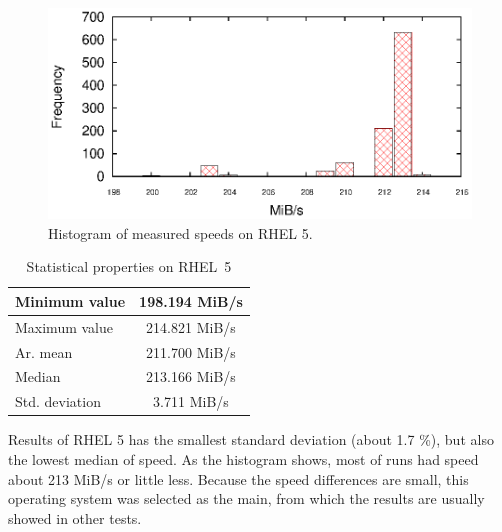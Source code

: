 

\begin{figure}[h!]
  \centering
 \includegraphics[width=12cm]{fig/tests/scattering_rhel5.eps} %
\caption{Histogram of measured speeds on RHEL 5.}
\label{fig:testing:stability-r5}
\end{figure}

\begin{table}[h!]
\begin{center}
\begin{tabular}{|l|c|}
  \hline
  Minimum value& 198.194 MiB/s\\
  \hline
  Maximum value& 214.821 MiB/s\\ 
  \hline
  Ar. mean & 211.700 MiB/s\\
  \hline
  Median & 213.166 MiB/s\\
  \hline
  Std. deviation & 3.711 MiB/s\\
  \hline
\end{tabular}
\caption{Statistical properties on RHEL~5}
\label{tab:testing:stability-stat-r5}
\end{center}
\end{table}

Results of RHEL 5 has the smallest standard deviation (about 1.7 \%), but also the lowest median of speed. As the histogram shows, most of runs had speed about 213 MiB/s or little less. Because the speed differences are small, this operating system was selected as the main, from which the results are usually showed in other tests.


